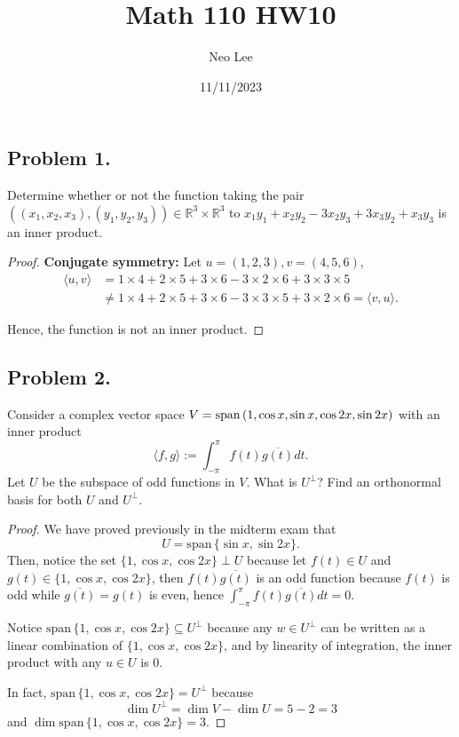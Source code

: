 \documentclass{article}
\title{Math 110 HW10}
\author{Neo Lee}
\date{11/11/2023}
\newcommand*{\spann}{\ensuremath{\mathrm{span}}\,}
\newcommand*{\R}{\ensuremath{\mathbb{R}}}
\begin{document}
 

\maketitle 

\subsection*{Problem 1.}
Determine whether or not the function taking the pair $((x_1,x_2,x_3),(y_1,y_2,y_3)) \in \R^3 
\times \R^3$ to $x_1y_1+x_2y_2-3x_2y_3+3x_3y_2+x_3y_3$ is an inner product. 
\begin{proof}
    \textbf{Conjugate symmetry:} Let $u=(1,2,3), v=(4,5,6)$,
    \begin{align*}
        \langle u,v\rangle & = 1\times 4 + 2\times 5 + 3\times 6 - 3\times 2\times 6 + 3\times 3\times 5 \\
        & \neq 1\times 4 + 2\times 5 + 3\times 6 - 3\times 3\times 5 + 3\times 2\times 6 = \langle v, u\rangle.
    \end{align*}

    Hence, the function is not an inner product.
\end{proof}

\newpage
\subsection*{Problem 2.}
Consider a complex vector space $V={\rm span}\, (1, \cos x, \sin x, \cos 2x, \sin 2x)$ with 
an inner product $$\langle f,g\rangle := \int_{-\pi}^{\pi} f(t)\overline{g(t)} dt.$$  
Let $U$ be the subspace of odd functions in $V$. What is $U^\perp$? Find an orthonormal 
basis for both $U$ and $U^\perp$. 
\begin{proof}
    We have proved previously in the midterm exam that $$U = \spann\{\sin x, \sin 2x\}.$$ Then, notice 
    the set $\{1, \cos x, \cos 2x\}\perp U$ because let $f(t)\in U$ and $g(t)\in
    \{1, \cos x, \cos 2x\}$, then $f(t)\overline{g(t)}$ is an odd function because $f(t)$ is odd while 
    $\overline{g(t)}=g(t)$ is even, hence $\int_{-\pi}^{\pi}f(t)\overline{g(t)}dt = 0$.

    Notice $\spann\{1,\cos x, \cos 2x\} \subseteq U^\perp$ because any $w\in U^\perp$ can be written as a 
    linear combination of $\{1,\cos x, \cos 2x\}$, and by linearity of integration, the inner product with any 
    $u\in U$ is 0.

    In fact, $\spann\{1,\cos x, \cos 2x\} = U^\perp$ because $$\dim U^\perp = \dim V - \dim U = 5-2=3$$
    and $\dim\spann\{1,\cos x, \cos 2x\}=3$.
\end{proof}
\end{document}
